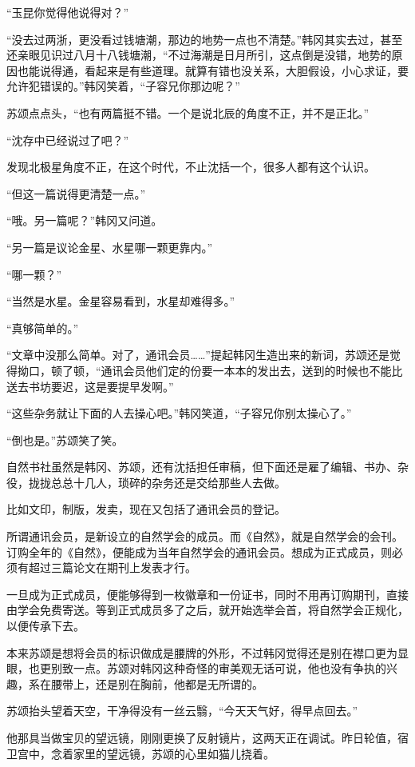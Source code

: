 “玉昆你觉得他说得对？”

“没去过两浙，更没看过钱塘潮，那边的地势一点也不清楚。”韩冈其实去过，甚至还亲眼见识过八月十八钱塘潮，“不过海潮是日月所引，这点倒是没错，地势的原因也能说得通，看起来是有些道理。就算有错也没关系，大胆假设，小心求证，要允许犯错误的。”韩冈笑着，“子容兄你那边呢？”

苏颂点点头，“也有两篇挺不错。一个是说北辰的角度不正，并不是正北。”

“沈存中已经说过了吧？”

发现北极星角度不正，在这个时代，不止沈括一个，很多人都有这个认识。

“但这一篇说得更清楚一点。”

“哦。另一篇呢？”韩冈又问道。

“另一篇是议论金星、水星哪一颗更靠内。”

“哪一颗？”

“当然是水星。金星容易看到，水星却难得多。”

“真够简单的。”

“文章中没那么简单。对了，通讯会员……”提起韩冈生造出来的新词，苏颂还是觉得拗口，顿了顿，“通讯会员他们定的份要一本本的发出去，送到的时候也不能比送去书坊要迟，这是要提早发啊。”

“这些杂务就让下面的人去操心吧。”韩冈笑道，“子容兄你别太操心了。”

“倒也是。”苏颂笑了笑。

自然书社虽然是韩冈、苏颂，还有沈括担任审稿，但下面还是雇了编辑、书办、杂役，拢拢总总十几人，琐碎的杂务还是交给那些人去做。

比如文印，制版，发卖，现在又包括了通讯会员的登记。

所谓通讯会员，是新设立的自然学会的成员。而《自然》，就是自然学会的会刊。订购全年的《自然》，便能成为当年自然学会的通讯会员。想成为正式成员，则必须有超过三篇论文在期刊上发表才行。

一旦成为正式成员，便能够得到一枚徽章和一份证书，同时不用再订购期刊，直接由学会免费寄送。等到正式成员多了之后，就开始选举会首，将自然学会正规化，以便传承下去。

本来苏颂是想将会员的标识做成是腰牌的外形，不过韩冈觉得还是别在襟口更为显眼，也更别致一点。苏颂对韩冈这种奇怪的审美观无话可说，他也没有争执的兴趣，系在腰带上，还是别在胸前，他都是无所谓的。

苏颂抬头望着天空，干净得没有一丝云翳，“今天天气好，得早点回去。”

他那具当做宝贝的望远镜，刚刚更换了反射镜片，这两天正在调试。昨日轮值，宿卫宫中，念着家里的望远镜，苏颂的心里如猫儿挠着。

